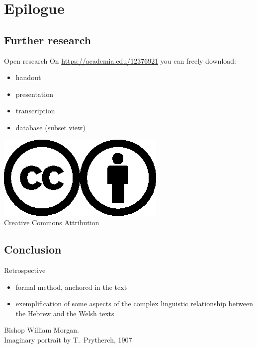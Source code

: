 \section{Epilogue}

\subsection{Further research}

\begin{frame}{Open research}
	On \url{https://academia.edu/12376921} you can freely download:
	\begin{itemize}
		\item handout
		\item presentation
		\item transcription
		\item database (subset view)
	\end{itemize}

	\vfill

	\begin{center}
		\includegraphics[width=2ex]{../cc.eps}\hspace{1ex}\includegraphics[width=2ex]{../by.eps}\\
		{\small Creative Commons Attribution}
	\end{center}
\end{frame}

\subsection{Conclusion}

\begin{frame}{Retrospective}
	\begin{itemize}
		\item formal method, anchored in the text
		\item exemplification of some aspects of the complex linguistic relationship between the Hebrew and the Welsh texts
	\end{itemize}
\end{frame}



\begin{frame}{}
	\begin{center}

		\vfill

		Bishop William Morgan.\\
		Imaginary portrait by T.\ Prytherch, 1907
	\end{center}
\end{frame}
